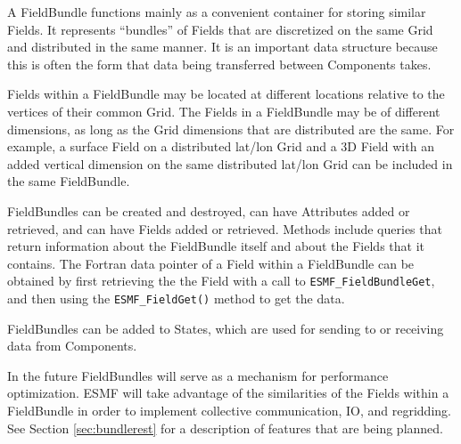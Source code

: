 
A FieldBundle functions mainly as a convenient container for storing
similar Fields.  It represents ``bundles'' of Fields that are 
discretized on the same Grid and distributed in the same manner.
It is an important data structure because this is often the form that
data being transferred between Components takes.  

Fields within a FieldBundle may be located at different locations relative 
to the vertices of their common Grid.  The Fields in a FieldBundle may
be of different dimensions, as long as the Grid dimensions that 
are distributed are the same.  For example, a surface Field on 
a distributed lat/lon Grid and a 3D Field with an added vertical 
dimension on the same distributed lat/lon Grid can be included
in the same FieldBundle.
 
FieldBundles can be created and destroyed, can have Attributes 
added or retrieved, and can have Fields added or retrieved.
Methods include queries that return information about the FieldBundle
itself and about the Fields that it contains.  The Fortran 
data pointer of a Field within a FieldBundle can be obtained 
by first retrieving the the Field with a call to {\tt ESMF\_FieldBundleGet},
and then using the {\tt ESMF\_FieldGet()} method to get the data.

FieldBundles can be added to States, which are used for sending
to or receiving data from Components.

In the future FieldBundles will serve as a mechanism for performance
optimization.  ESMF will take advantage of the similarities of the
Fields within a FieldBundle in order to implement collective communication,
IO, and regridding.  See Section \ref{sec:bundlerest} for a 
description of features that are being planned.





